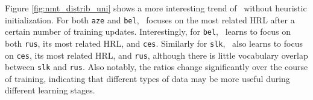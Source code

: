 
Figure \ref{fig:nmt_distrib_uni} shows a more interesting trend of \dds~without heuristic initialization.
For both \texttt{aze} and \texttt{bel}, \dds~focuses on the most related HRL after a certain number of training updates.
Interestingly, for \texttt{bel}, \dds~learns to focus on both \texttt{rus}, its most related HRL, and \texttt{ces}. Similarly for \texttt{slk}, \dds~also learns to focus on \texttt{ces}, its most related HRL, and \texttt{rus}, although there is little vocabulary overlap between \texttt{slk} and \texttt{rus}.
Also notably, the ratios change  significantly over the course of training, indicating that different types of data may be more useful during different learning stages.




